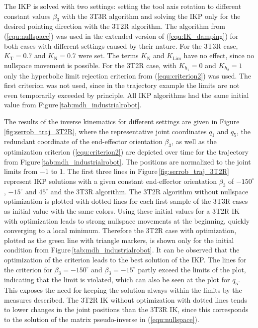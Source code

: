 \documentclass[robotics,article,accept,moreauthors,pdftex]{Definitions/mdpi}
\begin{document}
The IKP is solved with two settings: setting the tool axis rotation to different constant values $\beta_3$ with the 3T3R algorithm and solving the IKP only for the desired pointing direction with the 3T2R algorithm.
The algorithm from (\ref{equ:nullspace}) was used in the extended version of (\ref{equ:IK_damping}) for both cases with different settings caused by their nature.
For the 3T3R case, $K_\mathrm{T}=0.7$ and $K_\mathrm{N}=0.7$ were set.
The terms $K_\mathrm{N}$ and $K_\mathrm{Lim}$ have no effect, since no nullspace movement is possible.
For the 3T2R case, with $K_{h_1}=0$ and $K_{h_2}=1$ only the hyperbolic limit rejection criterion from (\ref{equ:criterion2}) was used.
The first criterion was not used, since in the trajectory example the limits are not even temporarily exceeded by principle.
All IKP algorithms had the same initial value from Figure\,\ref{tab:mdh_industrialrobot}.

The results of the inverse kinematics for different settings are given in Figure\,\ref{fig:serrob_traj_3T2R}, where the representative joint coordinates $q_1$ and $q_5$, the redundant coordinate of the end-effector orientation $\beta_3$, as well as the optimization criterion (\ref{equ:criterion2}) are depicted over time for the trajectory from Figure\,\ref{tab:mdh_industrialrobot}.
The positions are normalized to the joint limits from  $-1 $ to 1.
The first three lines in Figure\,\ref{fig:serrob_traj_3T2R} represent IKP solutions with a given constant end-effector orientation $\beta_3$ of $-150^\circ$, $-15^\circ$ and $45^\circ$ and the 3T3R algorithm.
The 3T2R algorithm without nullspace optimization is plotted with dotted lines for each first sample of the 3T3R cases as initial value with the same colors.
Using these initial values for a 3T2R IK with optimization leads to strong nullspace movements at the beginning, quickly converging to a local minimum.
Therefore\added[id=Sp]{,} the 3T2R case with optimization, plotted as the green line with triangle markers, is shown only for the initial condition from Figure\,\ref{tab:mdh_industrialrobot}.
%
It can be observed that the optimization of the criterion leads to the best solution of the IKP.
The lines for the criterion for $\beta_3=-150^\circ$ and $\beta_3=-15^\circ$ partly exceed the limits of the plot, indicating that the limit is violated, which can also be seen at the plot for $q_5$.
This exposes the need for keeping the solution always within the limits by the measures described.
The 3T2R IK without optimization with dotted lines tends to lower changes in the joint positions than the 3T3R IK, since this corresponds to the solution of the matrix \linebreak pseudo-inverse in (\ref{equ:nullspace}).
\end{document}
